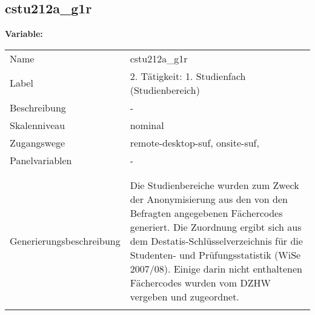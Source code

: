 	
	
	\subsection{cstu212a\_g1r}
	\label{subSection:cstu212a_g1r}

	\noindent\textbf{Variable:}\\
		\begin{tabular}{lL{11.3cm}}
			\label{tableVariable:cstu212a_g1r}
			Name & cstu212a\_g1r \\
			Label & 2. Tätigkeit: 1. Studienfach (Studienbereich) \\
			Beschreibung & - \\
			Skalenniveau & nominal \\
			Zugangswege &
				remote-desktop-suf,
				onsite-suf,
 \\
			Panelvariablen & -
			 \\
			 \\
 \\
					Generierungsbeschreibung & Die Studienbereiche wurden zum Zweck der Anonymisierung aus den von den Befragten angegebenen Fächercodes generiert. Die Zuordnung ergibt sich aus dem Destatis-Schlüsselverzeichnis für die Studenten- und Prüfungsstatistik (WiSe 2007/08). Einige darin nicht enthaltenen Fächercodes wurden vom DZHW vergeben und zugeordnet. 
				 \\	
			 \\
		\end{tabular}






